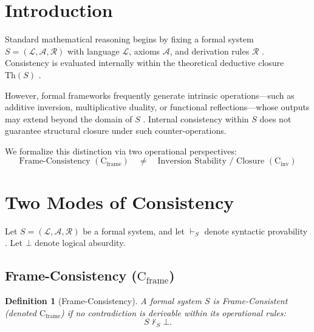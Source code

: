 \documentclass[11pt,a4paper]{article}
\newtheorem{definition}[theorem]{Definition}
\begin{document}
\clearpage

\section{Introduction}

Standard mathematical reasoning begins by fixing a formal system 
$S = (\mathcal{L}, \mathcal{A}, \mathcal{R})$ with language $\mathcal{L}$, 
axioms $\mathcal{A}$, and derivation rules $\mathcal{R}$ 
\cite{russell1903, godel1931formal}. Consistency is evaluated internally 
within the theoretical deductive closure $\text{Th}(S)$ 
\cite{tarski1936begriff}.

However, formal frameworks frequently generate intrinsic operations---such 
as additive inversion, multiplicative duality, or functional 
reflections---whose outputs may extend beyond the domain of $S$ 
\cite{nicht_theory_monograph}. Internal consistency within $S$ does not 
guarantee structural closure under such counter-operations.

We formalize this distinction via two operational perspectives:
\[
\boxed{
\text{Frame-Consistency } (\mathrm{C}_{\mathrm{frame}})
\quad\neq\quad
\text{Inversion Stability / Closure } (\mathrm{C}_{\mathrm{inv}})
}
\]

\section{Two Modes of Consistency}

Let $S = (\mathcal{L}, \mathcal{A}, \mathcal{R})$ be a formal system, 
and let $\vdash_S$ denote syntactic provability \cite{godel1931formal}. 
Let $\bot$ denote logical absurdity.

\subsection{Frame-Consistency (\texorpdfstring{$\mathrm{C}_{\mathrm{frame}}$}{C\_frame})}

\begin{definition}[Frame-Consistency]
A formal system $S$ is \emph{Frame-Consistent} (denoted $\mathrm{C}_{\mathrm{frame}}$) if 
no contradiction is derivable within its operational rules:
\[
S \nvdash_S \bot.
\]
\end{definition}
\end{document}
